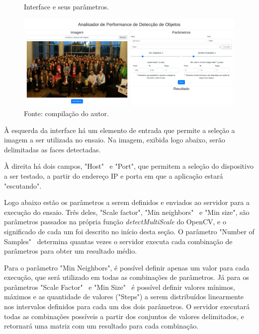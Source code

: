 \begin{figure}[h]
    \centering
    \caption[Interface e seus parâmetros.]{Interface e seus parâmetros.}
    \includegraphics[width=1.0\textwidth]{Cap3_Desenvolvimento/Figures/interface_parametros.png}
    \caption*{Fonte: compilação do autor.\footnotemark}
    \label{fig:interfaceUsuario}
\end{figure}



À esquerda da interface há um elemento de entrada que permite a seleção a imagem a ser utilizada no ensaio. Na imagem, exibida logo abaixo, serão delimitadas as faces detectadas.

À direita há dois campos, "Host" \ e "Port", que permitem a seleção do dispositivo a ser testado, a partir do endereço IP e porta em que a aplicação estará "escutando".

Logo abaixo estão os parâmetros a serem definidos e enviados ao servidor para a execução do ensaio. Três deles, "Scale factor", "Min neighbors" \ e "Min size", são parâmetros passados na própria função \textit{detectMultiScale} do OpenCV, e o significado de cada um foi descrito no início desta seção. O parâmetro "Number of Samples" \ determina quantas vezes o servidor executa cada combinação de parâmetros para obter um resultado médio.

Para o parâmetro "Min Neighbors", é possível definir apenas um valor para cada execução, que será utilizado em todas as combinações de parâmetros. Já para os parâmetros "Scale Factor" \ e "Min Size" \ é possível definir valores mínimos, máximos e as quantidade de valores ("Steps") a serem distribuídos linearmente nos intervalos definidos para cada um dos dois parâmetros. O servidor executará todas as combinações possíveis a partir dos conjuntos de valores delimitados, e retornará uma matriz com um resultado para cada combinação.

